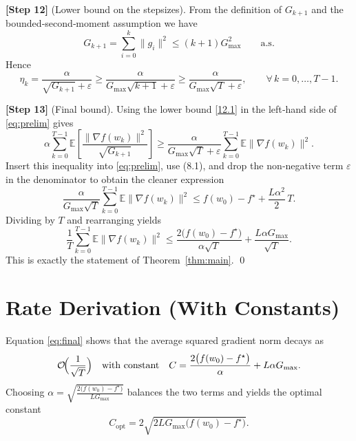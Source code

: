 \documentclass{article}
\begin{document}
\noindent\textbf{[Step 12]} (Lower bound on the stepsizes).  
From the definition of $G_{k+1}$ and the bounded‑second‑moment assumption we have
\[
G_{k+1}= \sum_{i=0}^{k}\|g_i\|^{2}\le (k+1)G_{\max}^{2}\qquad\text{a.s.}
\]
Hence
\[
\eta_k=\frac{\alpha}{\sqrt{G_{k+1}}+\varepsilon}
\ge
\frac{\alpha}{G_{\max}\sqrt{k+1}+\varepsilon}
\ge
\frac{\alpha}{G_{\max}\sqrt{T}+\varepsilon},
\qquad\forall\,k=0,\dots,T-1 .
\tag{12.1}
\]

\noindent\textbf{[Step 13]} (Final bound).  
Using the lower bound \eqref{12.1} in the left‑hand side of \eqref{eq:prelim} gives
\[
\alpha\sum_{k=0}^{T-1}\mathbb{E}\!\left[\frac{\|\nabla f(w_k)\|^{2}}{\sqrt{G_{k+1}}}\right]
\ge
\frac{\alpha}{G_{\max}\sqrt{T}+\varepsilon}
\sum_{k=0}^{T-1}\mathbb{E}\|\nabla f(w_k)\|^{2}.
\]
Insert this inequality into \eqref{eq:prelim}, use (8.1), and drop the non‑negative term $\varepsilon$ in the denominator to obtain the cleaner expression
\[
\frac{\alpha}{G_{\max}\sqrt{T}}
\sum_{k=0}^{T-1}\mathbb{E}\|\nabla f(w_k)\|^{2}
\le
f(w_0)-f^{\star}
+\frac{L\alpha^{2}}{2}\,T .
\]
Dividing by $T$ and rearranging yields
\begin{equation}
\frac{1}{T}\sum_{k=0}^{T-1}\mathbb{E}\|\nabla f(w_k)\|^{2}
\le
\frac{2\big(f(w_{0})-f^{\star}\big)}{\alpha\sqrt{T}}
+\frac{L\alpha G_{\max}}{\sqrt{T}} .
\label{eq:final}
\end{equation}
This is exactly the statement of Theorem~\ref{thm:main}. \qed

\section*{Rate Derivation (With Constants)}
Equation \eqref{eq:final} shows that the average squared gradient norm decays as
\[
\mathcal{O}\!\Bigl(\frac{1}{\sqrt{T}}\Bigr)
\quad\text{with constant}\quad
C = \frac{2\big(f(w_0)-f^{\star}\big)}{\alpha}
+ L\alpha G_{\max}.
\]
Choosing $\displaystyle\alpha=\sqrt{\frac{2\big(f(w_0)-f^{\star}\big)}{L G_{\max}}}$ balances the two terms and yields the optimal constant
\[
C_{\text{opt}} = 2\sqrt{2L G_{\max}\big(f(w_0)-f^{\star}\big)} .
\]
\end{document}
